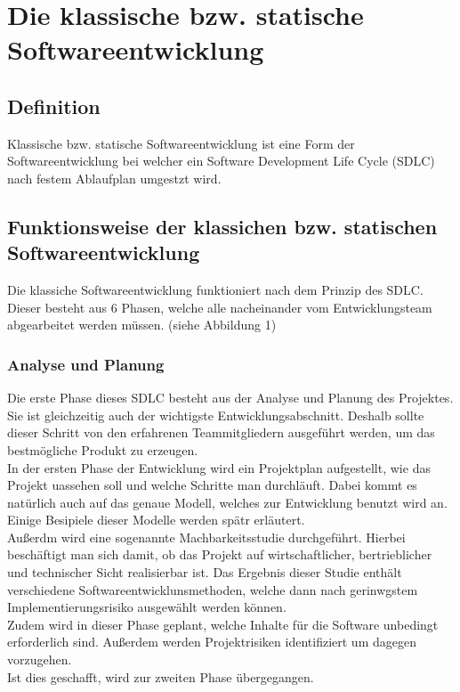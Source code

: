 \documentclass[a4paper, 10pt]{scrartcl}
\begin{document}
\section{Die klassische bzw. statische Softwareentwicklung}
\subsection{Definition}
\begin{center}
\large{Klassische bzw. statische Softwareentwicklung ist eine Form der Softwareentwicklung bei welcher ein \glqq Software Development Life Cycle (SDLC)\grqq{} nach festem Ablaufplan umgestzt wird.\citep{stoica}} 
\end{center}
\subsection{Funktionsweise der klassichen bzw. statischen Softwareentwicklung}
Die klassiche Softwareentwicklung funktioniert nach dem Prinzip des SDLC. Dieser besteht aus 6 Phasen, welche alle nacheinander vom Entwicklungsteam abgearbeitet werden müssen.\citep{stoica} (siehe Abbildung 1)
\subsubsection{Analyse und Planung}
Die erste Phase dieses SDLC besteht aus der Analyse und Planung des Projektes. Sie ist gleichzeitig auch der wichtigste Entwicklungsabschnitt. Deshalb sollte dieser Schritt von den erfahrenen Teammitgliedern ausgeführt werden, um das bestmögliche Produkt zu erzeugen.\\  
In der ersten Phase der Entwicklung wird ein Projektplan aufgestellt, wie das Projekt uassehen soll und welche Schritte man durchläuft. Dabei kommt es natürlich auch auf das genaue Modell, welches zur Entwicklung benutzt wird an. Einige Besipiele dieser Modelle werden spätr erläutert. \\
Außerdm wird eine sogenannte Machbarkeitsstudie durchgeführt. Hierbei beschäftigt man sich damit, ob das Projekt auf wirtschaftlicher, bertrieblicher und technischer Sicht realisierbar ist. Das Ergebnis dieser Studie enthält verschiedene Softwareentwicklunsmethoden, welche dann nach gerinwgstem Implementierungsrisiko ausgewählt werden können.\\
Zudem wird in dieser Phase geplant, welche Inhalte für die Software unbedingt erforderlich sind. Außerdem werden Projektrisiken identifiziert um dagegen vorzugehen. \citep{stoica}\\
Ist dies geschafft, wird zur zweiten Phase übergegangen.
\end{document}
